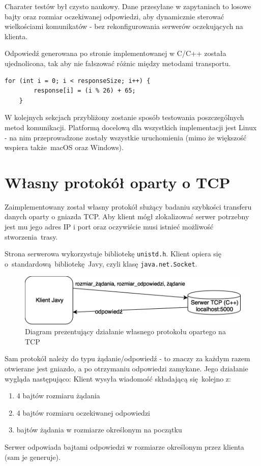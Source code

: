 Charater testów był czysto naukowy. Dane przesyłane w zapytaniach to losowe bajty oraz rozmiar oczekiwanej odpowiedzi, aby dynamicznie sterować wielkościami komunikatów - bez rekonfigurowania serwerów oczekujących na klienta.

Odpowiedź generowana po stronie implementowanej w C/C++ została ujednolicona, tak aby nie fałszować różnic między metodami transportu.

\begin{lstlisting}[caption={Fragment kodu wykorzystywanego w każdej metodzie komunikacji do generowania odpowiedzi},captionpos=b]
    for (int i = 0; i < responseSize; i++) {
        response[i] = (i % 26) + 65;
    }
\end{lstlisting}

W kolejnych sekcjach przybliżony zostanie sposób testowania poszczególnych metod komunikacji. Platformą docelową dla wszystkich implementacji jest Linux - na nim przeprowadzone zostały wszystkie uruchomienia (mimo że większość wspiera także macOS oraz Windows).

\section{Własny protokół oparty o TCP}

Zaimplementowany został własny protokół służący badaniu szybkości transferu danych oparty o gniazda TCP. Aby klient mógł zlokalizować serwer potrzebny jest mu jego adres IP i port oraz oczywiście musi istnieć możliwość stworzenia trasy.

Strona serwerowa wykorzystuje bibliotekę \texttt{unistd.h}. Klient opiera się o~standardową bibliotekę Javy, czyli klasę \texttt{java.net.Socket}.

\begin{figure}[h!]
    \centering
    \includegraphics[width=\textwidth,height=\textheight,keepaspectratio]{img/tcp_impl_diagram.png}
    \caption{Diagram prezentujący działanie własnego protokołu opartego na TCP}
\end{figure}

Sam protokół należy do typu żądanie/odpowiedź - to znaczy za każdym razem otwierane jest gniazdo, a po otrzymaniu odpowiedzi zamykane. Jego działanie wygląda następująco:
\newline
Klient wysyła wiadomość składającą się kolejno z:
\begin{enumerate}
    \item 4 bajtów rozmiaru żądania
    \item 4 bajtów rozmiaru oczekiwanej odpowiedzi
    \item bajtów żądania w rozmiarze określonym na początku
\end{enumerate}
Serwer odpowiada bajtami odpowiedzi w rozmiarze określonym przez klienta (sam je generuje).


